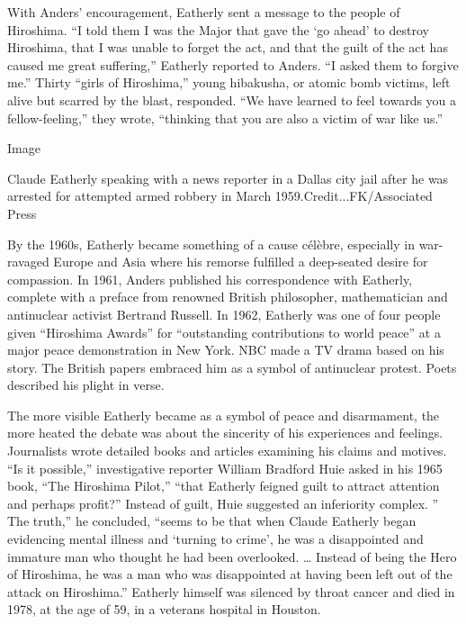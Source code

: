 With Anders' encouragement, Eatherly sent a message to the people of
Hiroshima. ``I told them I was the Major that gave the `go ahead' to
destroy Hiroshima, that I was unable to forget the act, and that the
guilt of the act has caused me great suffering,'' Eatherly reported to
Anders. ``I asked them to forgive me.'' Thirty ``girls of Hiroshima,''
young hibakusha, or atomic bomb victims, left alive but scarred by the
blast, responded. ``We have learned to feel towards you a
fellow-feeling,'' they wrote, ``thinking that you are also a victim of
war like us.''

Image

Claude Eatherly speaking with a news reporter in a Dallas city jail
after he was arrested for attempted armed robbery in March
1959.Credit...FK/Associated Press

By the 1960s, Eatherly became something of a cause célèbre, especially
in war-ravaged Europe and Asia where his remorse fulfilled a deep-seated
desire for compassion. In 1961, Anders published his correspondence with
Eatherly, complete with a preface from renowned British philosopher,
mathematician and antinuclear activist Bertrand Russell. In 1962,
Eatherly was one of four people given ``Hiroshima Awards'' for
``outstanding contributions to world peace'' at a major peace
demonstration in New York. NBC made a TV drama based on his story. The
British papers embraced him as a symbol of antinuclear protest. Poets
described his plight in verse.

The more visible Eatherly became as a symbol of peace and disarmament,
the more heated the debate was about the sincerity of his experiences
and feelings. Journalists wrote detailed books and articles examining
his claims and motives. ``Is it possible,'' investigative reporter
William Bradford Huie asked in his 1965 book, ``The Hiroshima Pilot,''
``that Eatherly feigned guilt to attract attention and perhaps profit?''
Instead of guilt, Huie suggested an inferiority complex. '' The truth,''
he concluded, ``seems to be that when Claude Eatherly began evidencing
mental illness and `turning to crime', he was a disappointed and
immature man who thought he had been overlooked. \ldots{} Instead of
being the Hero of Hiroshima, he was a man who was disappointed at having
been left out of the attack on Hiroshima.'' Eatherly himself was
silenced by throat cancer and died in 1978, at the age of 59, in a
veterans hospital in Houston.

